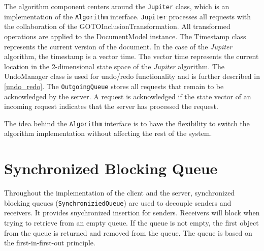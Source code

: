 The algorithm component centers around the \texttt{Jupiter} class, which is an implementation of the \texttt{Algorithm} interface. \texttt{Jupiter} processes all requests with the collaboration of the GOTOInclusionTransformation. All transformed operations are applied to the DocumentModel instance. The Timestamp class represents the current version of the document. In the case of the \emph{Jupiter} algorithm, the timestamp is a vector time. The vector time represents the current location in the 2-dimensional state space of the \emph{Jupiter} algorithm. The UndoManager class is used for undo/redo functionality and is further described in \ref{undo_redo}. The \texttt{OutgoingQueue} stores all requests that remain to be acknowledged by the server. A request is acknowledged if the state vector of an incoming request indicates that the server has processed the request.

The idea behind the \texttt{Algorithm} interface is to have the flexibility to switch the algorithm implementation without affecting the rest of the system.

\section{Synchronized Blocking Queue}
Throughout the implementation of the client and the server, synchronized blocking queues (\texttt{SynchroniziedQueue}) are used to decouple senders and receivers. It provides snychronized insertion for senders. Receivers will block when trying to retrieve from an empty queue. If the queue is not empty, the first object from the queue is returned and removed from the queue. The queue is based on the first-in-first-out principle.


